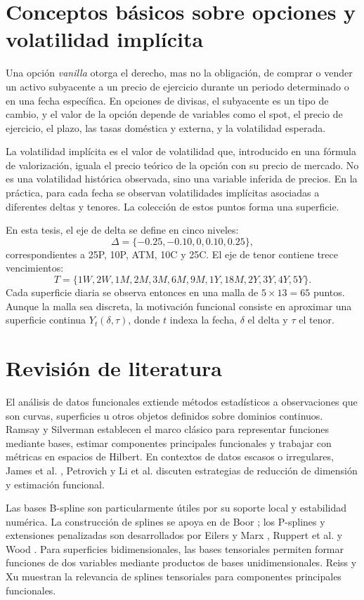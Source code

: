 \documentclass[12pt,a4paper]{article}
\begin{document}
\section{Conceptos básicos sobre opciones y volatilidad implícita}

Una opción \emph{vanilla} otorga el derecho, mas no la obligación, de comprar o vender un activo subyacente a un precio de ejercicio durante un periodo determinado o en una fecha específica. En opciones de divisas, el subyacente es un tipo de cambio, y el valor de la opción depende de variables como el spot, el precio de ejercicio, el plazo, las tasas doméstica y externa, y la volatilidad esperada.

La volatilidad implícita es el valor de volatilidad que, introducido en una fórmula de valorización, iguala el precio teórico de la opción con su precio de mercado. No es una volatilidad histórica observada, sino una variable inferida de precios. En la práctica, para cada fecha se observan volatilidades implícitas asociadas a diferentes deltas y tenores. La colección de estos puntos forma una superficie.

En esta tesis, el eje de delta se define en cinco niveles:
\[
\Delta=\{-0.25,-0.10,0,0.10,0.25\},
\]
correspondientes a 25P, 10P, ATM, 10C y 25C. El eje de tenor contiene trece vencimientos:
\[
T=\{1W,2W,1M,2M,3M,6M,9M,1Y,18M,2Y,3Y,4Y,5Y\}.
\]
Cada superficie diaria se observa entonces en una malla de \(5 \times 13=65\) puntos. Aunque la malla sea discreta, la motivación funcional consiste en aproximar una superficie continua \(Y_t(\delta,\tau)\), donde \(t\) indexa la fecha, \(\delta\) el delta y \(\tau\) el tenor.

\section{Revisión de literatura}

El análisis de datos funcionales extiende métodos estadísticos a observaciones que son curvas, superficies u otros objetos definidos sobre dominios continuos. Ramsay y Silverman \cite{RamsaySilverman2006} establecen el marco clásico para representar funciones mediante bases, estimar componentes principales funcionales y trabajar con métricas en espacios de Hilbert. En contextos de datos escasos o irregulares, James et al. \cite{JamesHastieSugar2000}, Petrovich \cite{Petrovich2018} y Li et al. \cite{Li2020} discuten estrategias de reducción de dimensión y estimación funcional.

Las bases B-spline son particularmente útiles por su soporte local y estabilidad numérica. La construcción de splines se apoya en de Boor \cite{DeBoor2001}; los P-splines y extensiones penalizadas son desarrollados por Eilers y Marx \cite{EilersMarx2003}, Ruppert et al. \cite{Ruppert2003} y Wood \cite{Wood2017}. Para superficies bidimensionales, las bases tensoriales permiten formar funciones de dos variables mediante productos de bases unidimensionales. Reiss y Xu \cite{ReissXu2020} muestran la relevancia de splines tensoriales para componentes principales funcionales.
\end{document}
